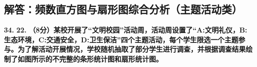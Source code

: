 \newpage

\newpage

\subsection{解答：频数直方图与扇形图综合分析（主题活动类）}

\vspace{0.6cm}

\textbf{\LARGE 34.} \textbf{\color{cyan!80!blue} 22. }\textbf{（8分）某校开展了“文明校园”活动周，活动周设置了“A:文明礼仪，B:生态环境，C:交通安全，D:卫生保洁”四个主题活动，每个学生限选一个主题参与。为了解活动开展情况，学校随机抽取了部分学生进行调查，并根据调查结果绘制了如图所示的不完整的条形统计图和扇形统计图。}

